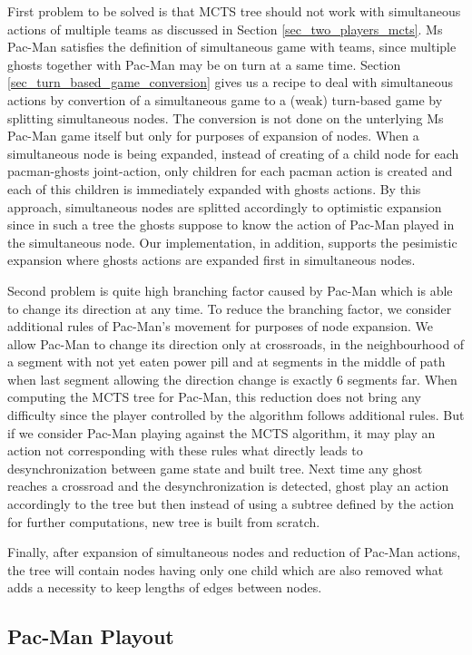 First problem to be solved is that MCTS tree should not work with simultaneous actions of
multiple teams as discussed in Section \ref{sec_two_players_mcts}. 
Ms Pac-Man satisfies the definition of simultaneous game with teams, since multiple ghosts
together with Pac-Man may be on turn at a same time.
Section 
\ref{sec_turn_based_game_conversion} gives us a recipe to deal with simultaneous actions by
convertion of a simultaneous game to a (weak) turn-based game by splitting simultaneous nodes. The
conversion is not done on the unterlying Ms Pac-Man game itself but only for purposes of
expansion of nodes. When a simultaneous node is being expanded, instead of creating of a child
node for each pacman-ghosts joint-action, only children for each pacman action is created and
each of this children is immediately expanded with ghosts actions. By this approach,
simultaneous nodes are splitted accordingly to optimistic expansion since in such a tree the
ghosts suppose to know the action of Pac-Man played in the simultaneous node. Our
implementation, in addition, supports the pesimistic expansion where ghosts actions are
expanded first in simultaneous nodes.

Second problem is quite high branching factor caused by Pac-Man which is able to change its
direction at any time. To reduce the branching factor, we consider additional rules of Pac-Man's
movement for purposes of node expansion. We allow Pac-Man to change its direction only at
crossroads, in the neighbourhood of a segment with not yet eaten power pill and at segments in
the middle of path when last segment allowing the direction change is exactly 6 segments far.
When computing the MCTS tree for Pac-Man, this reduction does not bring any difficulty since
the player controlled by the algorithm follows additional rules. But if we consider Pac-Man
playing against the MCTS algorithm, it may play an action not corresponding with these rules what
directly leads to desynchronization between game state and built tree. Next time any ghost
reaches  a crossroad and the desynchronization is detected, ghost play an action accordingly to
the tree but then instead of using a subtree defined by the action for further computations,
new tree is built from scratch.

Finally, after expansion of simultaneous nodes and reduction of Pac-Man actions, the tree
will contain nodes having only one child which are also removed what adds a necessity to keep
lengths of edges between nodes.


\subsection{Pac-Man Playout}
\label{sec_impl_playout}

